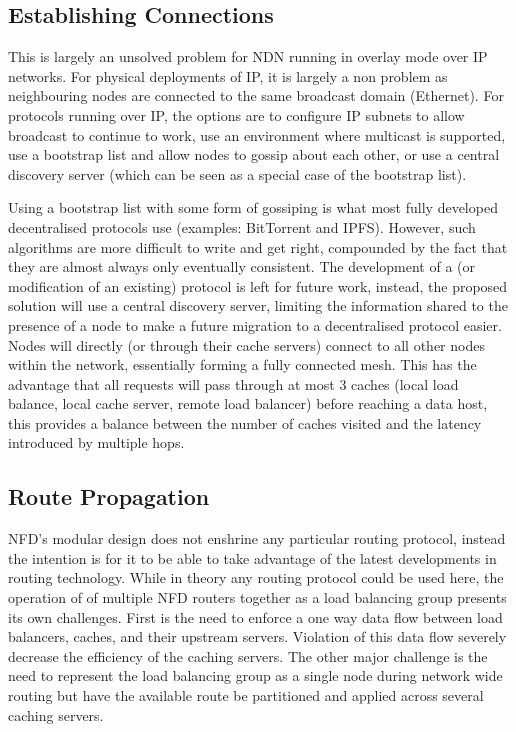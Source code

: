 \documentclass[letterpaper,12pt]{article}
\begin{document}
\subsection*{Establishing Connections}
This is largely an unsolved problem for NDN running in overlay mode over IP networks. For physical deployments of IP, it is largely a non problem as neighbouring nodes are connected to the same broadcast domain  (Ethernet). For protocols running over IP, the options are to configure IP subnets to allow broadcast to continue to work, use an environment where multicast is supported, use a bootstrap list and allow nodes to gossip about each other, or use a central discovery server (which can be seen as a special case of the bootstrap list).

Using a bootstrap list with some form of gossiping is what most fully developed decentralised protocols use (examples: BitTorrent and IPFS). However, such algorithms are more difficult to write and get right,  compounded by the fact that they are almost always only eventually consistent. The development of a (or modification of an existing) protocol is left for future work, instead, the proposed solution will use a central discovery server, limiting the information shared to the presence of a node to make a future migration to a decentralised protocol easier. Nodes will directly (or through their cache servers) connect to all other nodes within the network, essentially forming a fully connected mesh. This has the advantage that all requests will pass through at most 3 caches (local load balance, local cache server, remote load balancer) before reaching a data host, this provides a balance between the number of caches visited and the latency introduced by multiple hops.


\subsection*{Route Propagation}
NFD's modular design does not enshrine any particular routing protocol, instead the intention is for it to be able to take advantage of the latest developments in routing technology. While in theory any routing protocol could be used here, the operation of of multiple NFD routers together as a load balancing group presents its own challenges. First is the need to enforce a one way data flow between load balancers, caches, and their upstream servers. Violation of this data flow severely decrease the  efficiency of the caching servers. The other major challenge is the need to represent the load balancing group as a single node during network wide routing but have the available route be partitioned and applied across several caching servers.
\end{document}
